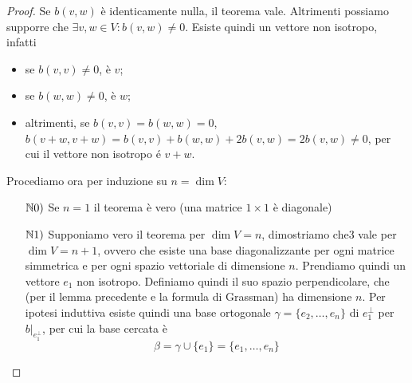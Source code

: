 \documentclass{article}     %
\begin{document}
\begin{proof}
    Se $b(v,w)$ è identicamente nulla, il teorema vale. Altrimenti possiamo supporre che $\exists v,w\in V: b(v,w)\neq 0$. Esiste quindi un vettore non isotropo, infatti 
    \begin{itemize}
        \item se $b(v,v)\neq 0$, è $v$;
        \item se $b(w,w)\neq 0$, è $w$;
        \item altrimenti, se $b(v,v)=b(w,w)=0$, $b(v+w,v+w)=b(v,v)+b(w,w)+2b(v,w)=2b(v,w)\neq 0$, per cui il vettore non isotropo é $v+w$.
    \end{itemize}
Procediamo ora per induzione su $n=\dim V$:
\begin{itemize}
    \item[$\mathbb{N}0)$] Se $n=1$ il teorema è vero (una matrice $1\times 1$ è diagonale)
    \item[$\mathbb{N}1)$] Supponiamo vero il teorema per $\dim V=n$, dimostriamo che3 vale per $\dim V = n+1$, ovvero che esiste una base diagonalizzante per ogni matrice simmetrica e per ogni spazio vettoriale di dimensione $n$. Prendiamo quindi un vettore $e_1$ non isotropo. Definiamo quindi il suo spazio perpendicolare, che (per il lemma precedente e la formula di Grassman) ha dimensione $n$. Per ipotesi induttiva esiste quindi una base ortogonale $\gamma=\{e_2, \dots, e_n\}$ di $e_1^\perp$ per $b|_{e_1^\perp}$, per cui la base cercata è \[\beta=\gamma \cup \{e_1\}=  \{e_1, \dots, e_n\}\]
\end{itemize}
\end{proof}
\end{document}
